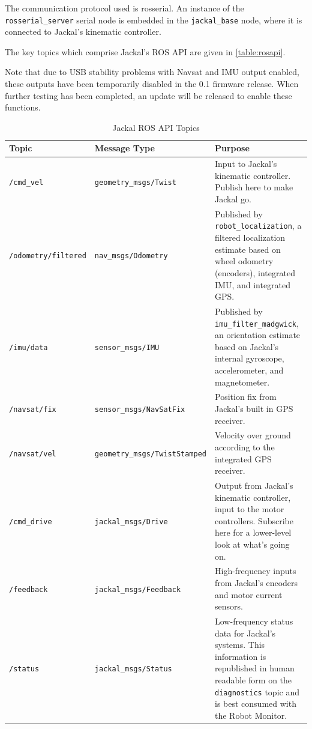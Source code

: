 \documentclass[]{clearpath-manual}
\begin{document}
The communication protocol used is rosserial. An instance of the \lstinline{rosserial_server}
serial node is embedded in the \lstinline{jackal_base} node, where it is connected to
Jackal's kinematic controller.

The key topics which comprise Jackal's ROS API are given in \autoref{table:rosapi}.

\begin{warning}
Note that due to USB stability problems with Navsat and IMU output enabled, these outputs
have been temporarily disabled in the 0.1 firmware release. When further testing has been
completed, an update will be released to enable these functions.
\end{warning}

\begin{table}[ht]
\begin{tabular}{  l  l  p{7cm} }
\hline
Topic & Message Type & Purpose \\ \hline

\lstinline{/cmd_vel} & \lstinline{geometry_msgs/Twist} & 
Input to Jackal's kinematic controller. Publish here to make Jackal go. \\ \hline
\lstinline{/odometry/filtered} & \lstinline{nav_msgs/Odometry} & 
Published by \lstinline{robot_localization}, a filtered localization estimate based
on wheel odometry (encoders), integrated IMU, and integrated GPS. \\ \hline

\lstinline{/imu/data} & \lstinline{sensor_msgs/IMU} & 
Published by \lstinline{imu_filter_madgwick}, an orientation estimate based on Jackal's
internal gyroscope, accelerometer, and magnetometer. \\ \hline
\lstinline{/navsat/fix} & \lstinline{sensor_msgs/NavSatFix} & 
Position fix from Jackal's built in GPS receiver. \\ \hline
\lstinline{/navsat/vel} & \lstinline{geometry_msgs/TwistStamped} & 
Velocity over ground according to the integrated GPS receiver.\\ \hline

\lstinline{/cmd_drive} & \lstinline{jackal_msgs/Drive} &
Output from Jackal's kinematic controller, input to the motor controllers. Subscribe here for a lower-level look at what's going on. \\ \hline
\lstinline{/feedback} & \lstinline{jackal_msgs/Feedback} &
High-frequency inputs from Jackal's encoders and motor current sensors. \\ \hline
\lstinline{/status} & \lstinline{jackal_msgs/Status} &
Low-frequency status data for Jackal's systems. This information is republished in human
readable form on the \lstinline{diagnostics} topic and is best consumed with the Robot
Monitor. \\ \hline
\end{tabular}
\caption{Jackal ROS API Topics}
\label{table:rosapi}
\end{table}
\end{document}

